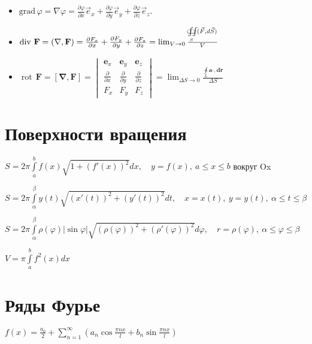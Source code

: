 \begin{itemize}
	\item
	${\mathrm  {grad}}\,\varphi =\nabla \varphi ={\frac  {\partial \varphi }{\partial x}}{\vec  e}_{x}+{\frac  {\partial \varphi }{\partial y}}{\vec  e}_{y}+{\frac  {\partial \varphi }{\partial z}}{\vec  e}_{z}.$
	
	\item
	$\operatorname {div}\,{\mathbf  {F}}= (\nabla , {\mathbf  {F}})= {\frac  {\partial F_{x}}{\partial x}}+{\frac  {\partial F_{y}}{\partial y}}+{\pd{F_{z}}{z}} = \lim _{{V\rightarrow 0}}{\frac{\iint \limits _{S}\!\!\!\!\!\!\!\!\!\!\subset \!\supset \,({\vec  F},d{\vec  S})}{V}}$
	
	\item
	$\operatorname{rot}\, \mathbf{F} = [\mathbf{\nabla} , \mathbf{F}] = \begin{vmatrix} \mathbf{e}_x & \mathbf{e}_y & \mathbf{e}_z \\  
	\frac{\partial}{\partial x} & \frac{\partial}{\partial y} & \frac{\partial}{\partial z} 
	\\  F_x & F_y & F_z 
	\end{vmatrix} 
	= \lim_{\Delta S\to 0}\frac{\oint\limits_{L}\mathbf{ a\cdot , dr}}{\Delta S}$
	
\end{itemize}

\section{Поверхности вращения}

$S=2\pi \int \limits _{a}^{b}f(x){\sqrt  {1+\left(f'(x)\right)^{2}}}dx, \quad y=f(x),\ a\leq x\leq b$ вокруг Ox

$S=2\pi \int \limits _{\alpha }^{\beta }y(t){\sqrt  {\left(x'(t)\right)^{2}+\left(y'(t)\right)^{2}}}dt, \quad x=x(t),\ y=y(t),\ \alpha \leq t\leq \beta  $

$S=2\pi \int \limits _{\alpha }^{\beta }\rho (\varphi )|\sin \varphi |{\sqrt  {\left(\rho (\varphi )\right)^{2}+\left(\rho '(\varphi )\right)^{2}}}d\varphi, \quad r=\rho (\varphi ),\ \alpha \leq \varphi \leq \beta $

$V=\pi \int \limits _{a}^{b}f^{2}(x)dx$


\section{Ряды Фурье}

$f(x)=\frac{a_0}{2} + \sum^{\infty}_{n=1} (a_n \cos \frac{\pi n x}{l} + b_n \sin \frac{\pi n x}{l})$

